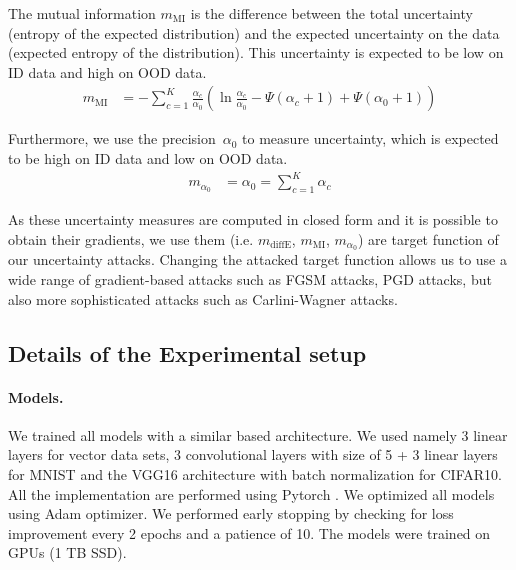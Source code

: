 The mutual information $m_{\mathrm{MI}}$ is the difference between the total uncertainty (entropy of the expected distribution) and the expected uncertainty on the data (expected entropy of the distribution). This uncertainty is expected to be low on ID data and high on OOD data. 
%
\begin{equation}
\begin{aligned}
	m_{\mathrm{MI}}  &= - \sum_{c=1}^{K} \frac{\alpha_c}{\alpha_0} \left( \ln \frac{\alpha_c}{\alpha_0} - \Psi(\alpha_c +1) + \Psi (\alpha_0 +1) \right)
\end{aligned}
\end{equation}

Furthermore, we use the precision~$\alpha_0$ to measure uncertainty, which is expected to be high on ID data and low on OOD data.
%
\begin{equation}
\begin{aligned}
	m_{\alpha_0}        &= \alpha_0 = \sum_{c=1}^{K} \alpha_c 
\end{aligned}
\end{equation}


As these uncertainty measures are computed in closed form and it is possible to obtain their gradients, we use them (i.e. $m_{\mathrm{diffE}}$, $m_{\mathrm{MI}}$, $m_{\alpha_0}$) are target function of our uncertainty attacks. Changing the attacked target function allows us to use a wide range of gradient-based attacks such as FGSM attacks, PGD attacks, but also more sophisticated attacks such as Carlini-Wagner attacks. 



\subsection{Details of the Experimental setup}
\label{subsec:exp_setup}

\paragraph{Models.} We trained all models with a similar based architecture. We used namely 3 linear layers for vector data sets, 3 convolutional layers with size of 5 + 3 linear layers for MNIST and the VGG16 \cite{vgg} architecture with batch normalization for CIFAR10. All the implementation are performed using Pytorch \citep{pytorch}. We optimized all models using Adam optimizer. We performed early stopping by checking for loss improvement every 2 epochs and a patience of 10. The models were trained on GPUs (1 TB SSD).

